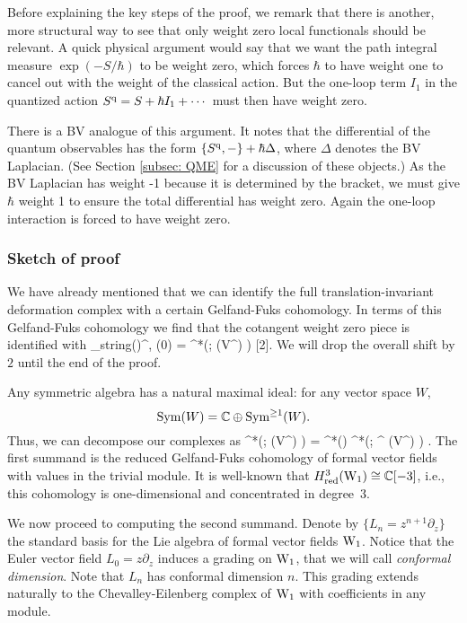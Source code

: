 Before explaining the key steps of the proof, 
we remark that there is another, more structural way to see that only weight zero local functionals should be relevant.
A quick physical argument would say that we want the path integral measure $\exp(-S/\hbar)$ to be weight zero,
which forces $\hbar$ to have weight one to cancel out with the weight of the classical action.
But the one-loop term $I_1$ in the quantized action $S^{\rm q} = S + \hbar I_1 + \cdots$ must then have weight zero.

There is a BV analogue of this argument.
It notes that the differential of the quantum observables has the form $\{S^{\rm q},-\} + \hbar \Delta$,
where $\Delta$ denotes the BV Laplacian.
(See Section \ref{subsec: QME} for a discussion of these objects.)
As the BV Laplacian has weight -1 because it is determined by the bracket,
we must give $\hbar$ weight 1 to ensure the total differential has weight zero.
Again the one-loop interaction is forced to have weight zero.

\subsubsection{Sketch of proof}
We have already mentioned that we can identify the full translation-invariant deformation complex with a certain Gelfand-Fuks cohomology. 
In terms of this Gelfand-Fuks cohomology we find that the cotangent weight zero piece is identified with 
\ben
\Def_{\rm string}(\CC)^{\CC, \wt(0)} = \cred^*\left(\wone ; \Sym(V^\vee[z^\vee]) \right) [2]. 
\een 
We will drop the overall shift by $2$ until the end of the proof. 

Any symmetric algebra has a natural maximal ideal: 
for any vector space $W$,
\[
{\rm Sym}(W) = \mathbb C \oplus {\rm Sym}^{\geq 1}(W).
\] 
Thus, we can decompose our complexes as
\ben
 \cred^*\left(\wone ; \Sym(V^\vee[z^\vee]) \right) =   \cred^*(\wone) \oplus \clie^*\left(\wone ; \Sym^{} (V^\vee[z^\vee]) \right) .
 \een
The first summand is the reduced Gelfand-Fuks cohomology of formal vector fields with values in the trivial module.
It is well-known that $H^3_{\rm red} ({\rm W}_1) \cong \mathbb C[-3]$, 
i.e., this cohomology is one-dimensional and concentrated in degree~$3$. 

We now proceed to computing the second summand. 
Denote by $\{L_n = z^{n+1} \partial_z\}$ the standard basis for the Lie algebra of formal vector fields ${\rm W}_1$. 
Notice that the Euler vector field $L_0 = z \partial_z$ induces a grading on ${\rm W}_1$,
that we will call {\em conformal dimension}.
Note that $L_n$ has conformal dimension $n$. 
This grading extends naturally to the Chevalley-Eilenberg complex of ${\rm W}_1$ with coefficients in any module. 

